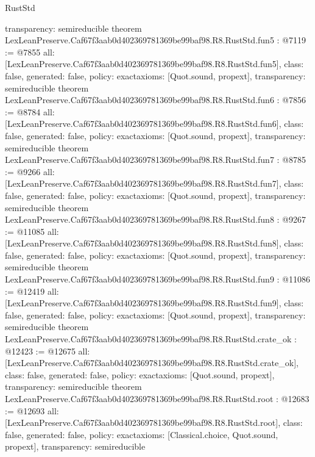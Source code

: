 \begin{lexlean}{RustStd}
\begin{coremodule}
{  transparency: semireducible
}
theorem LexLeanPreserve.Caf67f3aab0d402369781369be99baf98.R8.RustStd.fun5 : @7119 := @7855 {
  all: [LexLeanPreserve.Caf67f3aab0d402369781369be99baf98.R8.RustStd.fun5],
  class: false,
  generated: false,
  policy: exact{axioms: [Quot.sound, propext]},
  transparency: semireducible
}
theorem LexLeanPreserve.Caf67f3aab0d402369781369be99baf98.R8.RustStd.fun6 : @7856 := @8784 {
  all: [LexLeanPreserve.Caf67f3aab0d402369781369be99baf98.R8.RustStd.fun6],
  class: false,
  generated: false,
  policy: exact{axioms: [Quot.sound, propext]},
  transparency: semireducible
}
theorem LexLeanPreserve.Caf67f3aab0d402369781369be99baf98.R8.RustStd.fun7 : @8785 := @9266 {
  all: [LexLeanPreserve.Caf67f3aab0d402369781369be99baf98.R8.RustStd.fun7],
  class: false,
  generated: false,
  policy: exact{axioms: [Quot.sound, propext]},
  transparency: semireducible
}
theorem LexLeanPreserve.Caf67f3aab0d402369781369be99baf98.R8.RustStd.fun8 : @9267 := @11085 {
  all: [LexLeanPreserve.Caf67f3aab0d402369781369be99baf98.R8.RustStd.fun8],
  class: false,
  generated: false,
  policy: exact{axioms: [Quot.sound, propext]},
  transparency: semireducible
}
theorem LexLeanPreserve.Caf67f3aab0d402369781369be99baf98.R8.RustStd.fun9 : @11086 := @12419 {
  all: [LexLeanPreserve.Caf67f3aab0d402369781369be99baf98.R8.RustStd.fun9],
  class: false,
  generated: false,
  policy: exact{axioms: [Quot.sound, propext]},
  transparency: semireducible
}
theorem LexLeanPreserve.Caf67f3aab0d402369781369be99baf98.R8.RustStd.crate_ok : @12423 := @12675 {
  all: [LexLeanPreserve.Caf67f3aab0d402369781369be99baf98.R8.RustStd.crate_ok],
  class: false,
  generated: false,
  policy: exact{axioms: [Quot.sound, propext]},
  transparency: semireducible
}
theorem LexLeanPreserve.Caf67f3aab0d402369781369be99baf98.R8.RustStd.root : @12683 := @12693 {
  all: [LexLeanPreserve.Caf67f3aab0d402369781369be99baf98.R8.RustStd.root],
  class: false,
  generated: false,
  policy: exact{axioms: [Classical.choice, Quot.sound, propext]},
  transparency: semireducible
}


\end{coremodule}
\end{lexlean}
